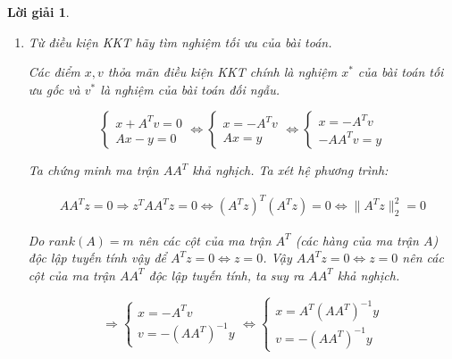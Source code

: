 \documentclass[14pt, a4paper]{article}
\theoremstyle{sltheorem}
\theoremstyle{soltheorem}
\newtheorem*{loigiai}{Lời giải}
\begin{document}
\begin{loigiai}
\begin{enumerate} [wide, labelwidth=!, labelindent=0pt,label=\textbf{\arabic*}.]
            Để $0 \in \partial g(x) \Rightarrow \nabla g(x) = 0 \Rightarrow x + A^T v = 0$.
            Ta viết lại điều kiện KKT:

            \begin{equation*}
                \begin{cases} x + A^Tv=0 \\ Ax - y = 0 \end{cases}
            \end{equation*}

            \item Từ điều kiện KKT hãy tìm nghiệm tối ưu của bài toán.
            
            Các điểm $x, v$ thỏa mãn điều kiện KKT chính là nghiệm $x^*$ của bài toán tối ưu gốc và $v^*$ là nghiệm của bài toán đối ngẫu.

            \begin{equation*}
                \begin{cases} x + A^Tv=0 \\ Ax - y = 0 \end{cases} 
                \Leftrightarrow \begin{cases} x = -A^T v \\ Ax = y \end{cases}
                \Leftrightarrow \begin{cases} x = -A^T v \\ - A A^T v =y \end{cases}
            \end{equation*}

            Ta chứng minh ma trận $AA^T$ khả nghịch. Ta xét hệ phương trình:

            \begin{equation*}
                \begin{aligned}
                    A A^T z = 0 \Rightarrow z^T A A^T z = 0 \Leftrightarrow (A^T z)^T (A^T z)=0 \Leftrightarrow \lVert A^T z \rVert_2^2 = 0
                \end{aligned}
            \end{equation*}

            Do $rank(A)=m$ nên các cột của ma trận $A^T$ (các hàng của ma trận $A$) độc lập tuyến tính vậy để $A^T z = 0 \Leftrightarrow z = 0$. Vậy $AA^Tz=0 \Leftrightarrow z =0$ nên các cột của ma trận $AA^T$ độc lập tuyến tính, ta suy ra $A A^T$ khả nghịch.

            \begin{equation*}
                \Rightarrow \begin{cases} x = -A^T  v \\ v = - (A A^T)^{-1}y \end{cases} \Leftrightarrow \begin{cases} x = A^T  (A A^T)^{-1}y \\ v = - (A A^T)^{-1}y \end{cases}
            \end{equation*}


\end{enumerate}
\end{loigiai}
\end{document}
